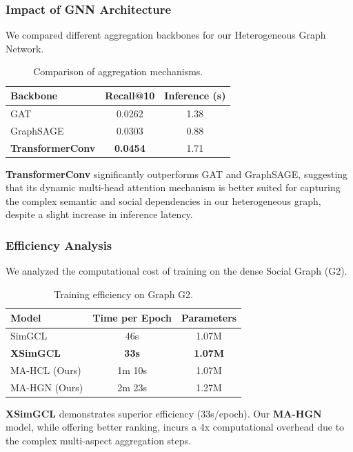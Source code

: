 \documentclass[11pt]{article}
\begin{document}
\subsubsection{Impact of GNN Architecture}
We compared different aggregation backbones for our Heterogeneous Graph Network.
\begin{table}[h]
  \centering
  \small
  \begin{tabular}{lcc}
    \hline
    \textbf{Backbone}        & \textbf{Recall@10} & \textbf{Inference (s)} \\
    \hline
    GAT                      & 0.0262             & 1.38                   \\
    GraphSAGE                & 0.0303             & 0.88                   \\
    \textbf{TransformerConv} & \textbf{0.0454}    & 1.71                   \\
    \hline
  \end{tabular}
  \caption{Comparison of aggregation mechanisms.}
\end{table}
\textbf{TransformerConv} significantly outperforms GAT and GraphSAGE, suggesting that its dynamic multi-head attention mechanism is better suited for capturing the complex semantic and social dependencies in our heterogeneous graph, despite a slight increase in inference latency.

\subsubsection{Efficiency Analysis}
We analyzed the computational cost of training on the dense Social Graph (G2).
\begin{table}[h]
  \centering
  \small
  \begin{tabular}{lcc}
    \hline
    \textbf{Model}   & \textbf{Time per Epoch} & \textbf{Parameters} \\
    \hline
    SimGCL           & 46s                     & 1.07M               \\
    \textbf{XSimGCL} & \textbf{33s}            & \textbf{1.07M}      \\
    MA-HCL (Ours)    & 1m 10s                  & 1.07M               \\
    MA-HGN (Ours)    & 2m 23s                  & 1.27M               \\
    \hline
  \end{tabular}
  \caption{Training efficiency on Graph G2.}
\end{table}
\textbf{XSimGCL} demonstrates superior efficiency (33s/epoch). Our \textbf{MA-HGN} model, while offering better ranking, incurs a 4x computational overhead due to the complex multi-aspect aggregation steps.
\end{document}
